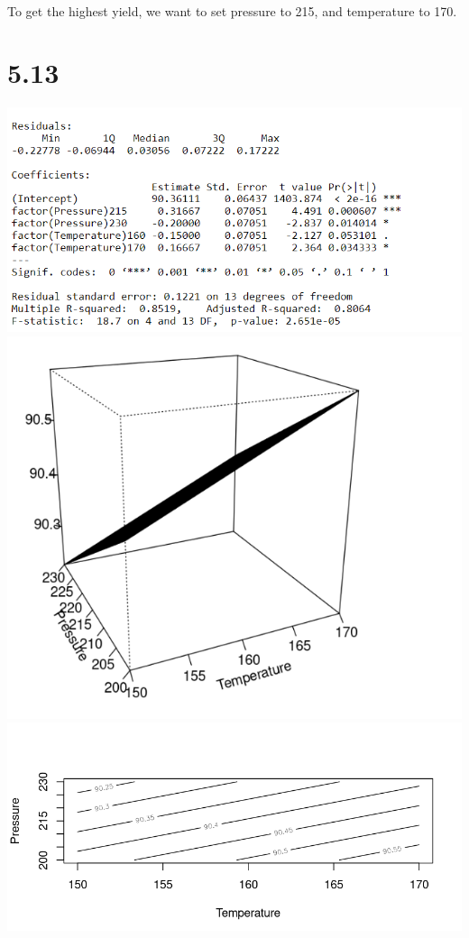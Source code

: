 \documentclass{article}
\begin{document}
\\To get the highest yield, we want to set pressure to 215, and temperature to 170.

\section*{5.13}
\includegraphics{5.13.PNG}
\\\includegraphics{5.13persp.PNG}
\\\includegraphics{5.13cont.PNG}
\end{document}
